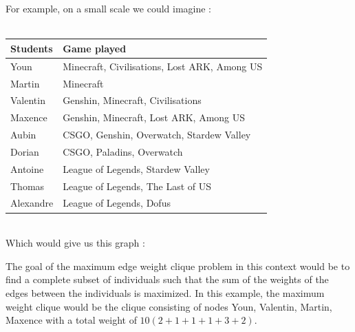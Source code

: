 \documentclass{article}
\begin{document}
    \\ \\
    For example, on a small scale we could imagine :
    \\ \\
    \begin{tabular}{|p{10em}|p{35em}|}
        \hline
        \textbf{Students} & \textbf{Game played} \\
        \hline
        Youn & Minecraft, Civilisations, Lost ARK, Among US \\
        \hline
        Martin & Minecraft \\
        \hline
        Valentin & Genshin, Minecraft, Civilisations \\
        \hline
        Maxence & Genshin, Minecraft, Lost ARK, Among US \\
        \hline
        Aubin & CSGO, Genshin, Overwatch, Stardew Valley\\
        \hline
        Dorian & CSGO, Paladins, Overwatch \\
        \hline
        Antoine & League of Legends, Stardew Valley \\
        \hline
        Thomas & League of Legends, The Last of US \\
        \hline
        Alexandre & League of Legends, Dofus \\
        \hline
    \end{tabular}
    \vspace{1\baselineskip} \\
    Which would give us this graph :

    \begin{center}
    \end{center}
    
    The goal of the maximum edge weight clique problem in this context would be to find a complete subset of individuals such that the sum of the weights of the edges between the individuals is maximized. In this example, the maximum weight clique would be the clique consisting of nodes Youn, Valentin, Martin, Maxence with a total weight of $10(2+1+1+1+3+2)$.
\end{document}
